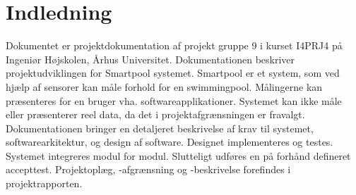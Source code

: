 \chapter{Indledning}


Dokumentet er projektdokumentation af projekt gruppe 9 i kurset I4PRJ4 på Ingeniør Højskolen, Århus 
Universitet. Dokumentationen beskriver projektudviklingen for Smartpool systemet. 
Smartpool er et system, som ved hjælp af sensorer kan måle forhold for en swimmingpool. Målingerne kan 
præsenteres for en bruger vha. softwareapplikationer. Systemet kan ikke måle eller præsenterer reel data, da det i projektafgrænsningen er fravalgt. 
Dokumentationen bringer en detaljeret beskrivelse af krav til systemet, softwarearkitektur, og design af software. 
Designet implementeres og testes. Systemet integreres modul for modul. Slutteligt udføres en på forhånd defineret accepttest. 
Projektoplæg, -afgrænsning og -beskrivelse forefindes i projektrapporten. 